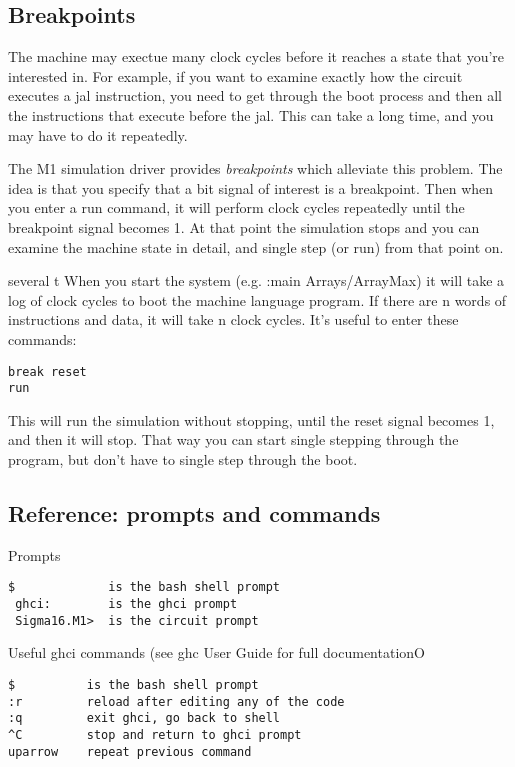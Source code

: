 \documentclass[11pt]{article}
\begin{document}
\subsection{Breakpoints}
\label{sec:org272c6e7}

The machine may exectue many clock cycles before it reaches a state
that you're interested in.  For example, if you want to examine
exactly how the circuit executes a jal instruction, you need to get
through the boot process and then all the instructions that execute
before the jal.  This can take a long time, and you may have to do it
repeatedly.

The M1 simulation driver provides \emph{breakpoints} which alleviate this
problem.  The idea is that you specify that a bit signal of interest
is a breakpoint.  Then when you enter a run command, it will perform
clock cycles repeatedly until the breakpoint signal becomes 1.  At
that point the simulation stops and you can examine the machine state
in detail, and single step (or run) from that point on.

several t
When you start the system (e.g. :main Arrays/ArrayMax) it will take a
log of clock cycles to boot the machine language program.  If there
are n words of instructions and data, it will take n clock cycles.
It's useful to enter these commands:

\begin{verbatim}
break reset
run
\end{verbatim}

This will run the simulation without stopping, until the reset signal
becomes 1, and then it will stop.  That way you can start single
stepping through the program, but don't have to single step through
the boot.

\subsection{Reference: prompts and commands}
\label{sec:org9182d3c}

Prompts
\begin{verbatim}
$             is the bash shell prompt
 ghci:        is the ghci prompt
 Sigma16.M1>  is the circuit prompt
\end{verbatim}

Useful ghci commands (see ghc User Guide for full documentationO
\begin{verbatim}
$          is the bash shell prompt
:r         reload after editing any of the code
:q         exit ghci, go back to shell
^C         stop and return to ghci prompt
uparrow    repeat previous command
\end{verbatim}
\end{document}

